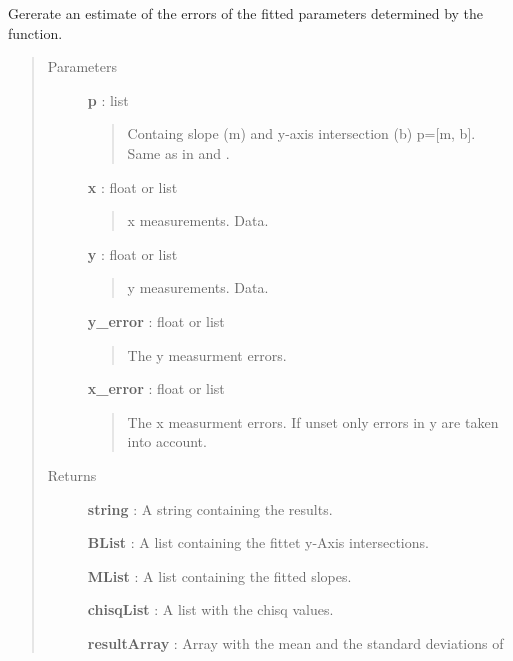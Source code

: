 \documentclass[a4paper,10pt,english]{sphinxmanual}
\begin{document}
\begin{fulllineitems}
\label{functions:astrolyze.functions.astro_functions.line_monte_carlo}
Gererate an estimate of the errors of the fitted parameters determined by
the {\hyperref[functions:astrolyze.functions.astro_functions.line_fit]{}} function.
\begin{quote}\begin{description}
\item[{Parameters }] \leavevmode
\textbf{p} : list
\begin{quote}

Containg slope (m) and y-axis intersection (b) p={[}m, b{]}. Same as in
{\hyperref[functions:astrolyze.functions.astro_functions.line]{}} and .
\end{quote}

\textbf{x} : float or list
\begin{quote}

x measurements. Data.
\end{quote}

\textbf{y} : float or list
\begin{quote}

y measurements. Data.
\end{quote}

\textbf{y\_error} : float or list
\begin{quote}

The y measurment errors.
\end{quote}

\textbf{x\_error} : float or list
\begin{quote}

The x measurment errors. If unset only errors in y are taken into
account.
\end{quote}

\item[{Returns }] \leavevmode
\textbf{string} : A string containing the results.

\textbf{BList} : A list containing the fittet y-Axis intersections.

\textbf{MList} : A list containing the fitted slopes.

\textbf{chisqList} : A list with the chisq values.

\textbf{resultArray} : Array with the mean and the standard deviations of
\begin{quote}


\end{quote}
\end{description}
\end{quote}
\end{fulllineitems}
\end{document}
